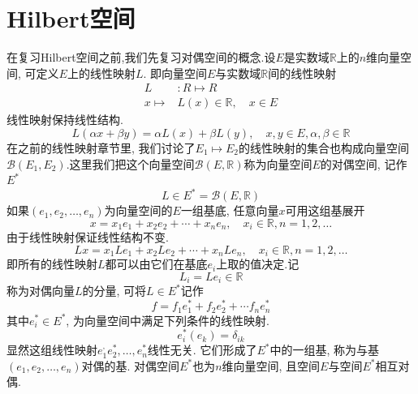 \documentclass[a4paper,11pt]{book}
\begin{document}
\section{Hilbert空间}\label{Hilbert Space}
在复习Hilbert空间之前,我们先复习对偶空间的概念.设$E$是实数域$\mathbb{R}$上的$n$维向量空间, 可定义$E$上的线性映射$L$. 即向量空间$E$与实数域$\mathbb{R}$间的线性映射
\begin{equation*}
\begin{split}
   L&:R\mapsto R \\
     x\mapsto&L(x)\in \mathbb{R},\quad x\in E
\end{split}
\end{equation*}
线性映射保持线性结构.
\begin{equation*}
  L(\alpha x+\beta y)=\alpha L(x)+\beta L(y),\quad x,y\in E,\alpha,\beta\in\mathbb{R}
\end{equation*}
在之前的线性映射章节里, 我们讨论了$E_1\mapsto E_2$的线性映射的集合也构成向量空间$\mathcal{B}(E_1,E_2)$.这里我们把这个向量空间$\mathcal{B}(E,\mathbb{R})$称为向量空间$E$的对偶空间, 记作$E^*$
\begin{equation*}
  L\in E^*=\mathcal{B}(E,\mathbb{R})
\end{equation*}
如果$(e_1,e_2,\dots,e_n)$为向量空间的$E$一组基底, 任意向量$x$可用这组基展开
\begin{equation*}
  x=x_1e_1+x_2e_2+\cdots+x_ne_n, \quad x_i\in\mathbb{R},n=1,2,\dots
\end{equation*}
由于线性映射保证线性结构不变.
\begin{equation*}
  Lx=x_1Le_1+x_2Le_2+\cdots+x_nLe_n, \quad x_i\in\mathbb{R},n=1,2,\dots
\end{equation*}
即所有的线性映射$L$都可以由它们在基底$e_i$上取的值决定.记
\begin{equation*}
  L_i=Le_i\in\mathbb{R}
\end{equation*}
称为对偶向量$L$的分量, 可将$L\in E^*$记作
\begin{equation*}
  f=f_1e_1^*+f_2e_2^*+\cdots f_ne_n^*
\end{equation*}
其中$e_i^*\in E^*$, 为向量空间中满足下列条件的线性映射.
\begin{equation*}
  e_i^*(e_k)=\delta_{ik}
\end{equation*}
显然这组线性映射$e_1^,e_2^*,\dots,e_n^*$线性无关. 它们形成了$E^*$中的一组基, 称为与基$(e_1,e_2,\dots,e_n)$对偶的基. 对偶空间$E^*$也为$n$维向量空间, 且空间$E$与空间$E^*$相互对偶.
\end{document}
